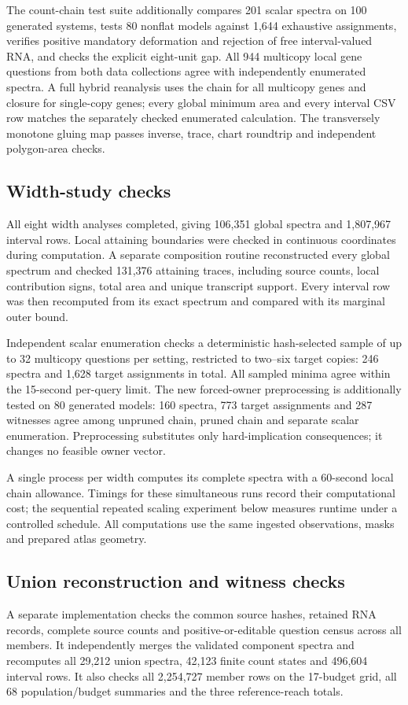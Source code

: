 \documentclass[10pt,letterpaper]{article}
\begin{document}
The count-chain test suite additionally compares 201 scalar spectra on 100 generated systems, tests 80 nonflat models against 1,644 exhaustive assignments, verifies positive mandatory deformation and rejection of free interval-valued RNA, and checks the explicit eight-unit gap. All 944 multicopy local gene questions from both data collections agree with independently enumerated spectra. A full hybrid reanalysis uses the chain for all multicopy genes and closure for single-copy genes; every global minimum area and every interval CSV row matches the separately checked enumerated calculation. The transversely monotone gluing map passes inverse, trace, chart roundtrip and independent polygon-area checks.

\subsection{Width-study checks}
All eight width analyses completed, giving 106,351 global spectra and 1,807,967 interval rows. Local attaining boundaries were checked in continuous coordinates during computation. A separate composition routine reconstructed every global spectrum and checked 131,376 attaining traces, including source counts, local contribution signs, total area and unique transcript support. Every interval row was then recomputed from its exact spectrum and compared with its marginal outer bound.

Independent scalar enumeration checks a deterministic hash-selected sample of up to 32 multicopy questions per setting, restricted to two--six target copies: 246 spectra and 1,628 target assignments in total. All sampled minima agree within the 15-second per-query limit. The new forced-owner preprocessing is additionally tested on 80 generated models: 160 spectra, 773 target assignments and 287 witnesses agree among unpruned chain, pruned chain and separate scalar enumeration. Preprocessing substitutes only hard-implication consequences; it changes no feasible owner vector.

A single process per width computes its complete spectra with a 60-second local chain allowance. Timings for these simultaneous runs record their computational cost; the sequential repeated scaling experiment below measures runtime under a controlled schedule. All computations use the same ingested observations, masks and prepared atlas geometry.

\subsection{Union reconstruction and witness checks}
A separate implementation checks the common source hashes, retained RNA records, complete source counts and positive-or-editable question census across all members. It independently merges the validated component spectra and recomputes all 29,212 union spectra, 42,123 finite count states and 496,604 interval rows. It also checks all 2,254,727 member rows on the 17-budget grid, all 68 population/budget summaries and the three reference-reach totals.
\end{document}
